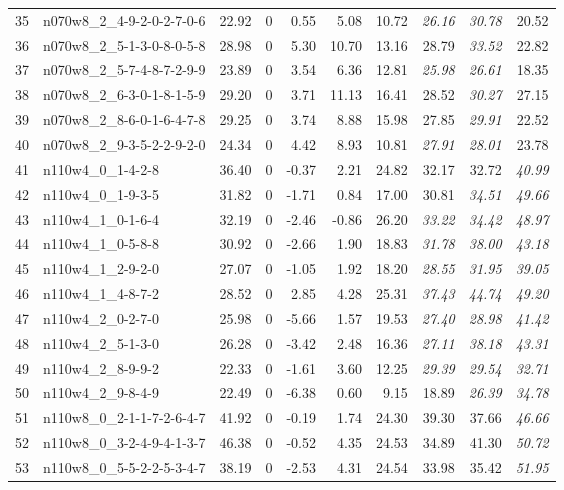 \documentclass[cic,tc, twoside]{iiufrgs}
\begin{document}
\begin{table}[!]
{\begin{tabular}{rlrrrrrrrr}
   35 & n070w8\_2\_4-9-2-0-2-7-0-6 & 22.92 &   0 & 0.55 & 5.08 & 10.72 & \it 26.16 & \it 30.78 & 20.52 \\
   36 & n070w8\_2\_5-1-3-0-8-0-5-8 & 28.98 &   0 & 5.30 & 10.70 & 13.16 & 28.79 & \it 33.52 & 22.82 \\
   37 & n070w8\_2\_5-7-4-8-7-2-9-9 & 23.89 &   0 & 3.54 & 6.36 & 12.81 & \it 25.98 & \it 26.61 & 18.35 \\
   38 & n070w8\_2\_6-3-0-1-8-1-5-9 & 29.20 &   0 & 3.71 & 11.13 & 16.41 & 28.52 & \it 30.27 & 27.15 \\
   39 & n070w8\_2\_8-6-0-1-6-4-7-8 & 29.25 &   0 & 3.74 & 8.88 & 15.98 & 27.85 & \it 29.91 & 22.52 \\
   40 & n070w8\_2\_9-3-5-2-2-9-2-0 & 24.34 &   0 & 4.42 & 8.93 & 10.81 & \it 27.91 & \it 28.01 & 23.78 \\
   41 & n110w4\_0\_1-4-2-8 & 36.40 &   0 & -0.37 & 2.21 & 24.82 & 32.17 & 32.72 & \it 40.99 \\
   42 & n110w4\_0\_1-9-3-5 & 31.82 &   0 & -1.71 & 0.84 & 17.00 & 30.81 & \it 34.51 & \it 49.66 \\
   43 & n110w4\_1\_0-1-6-4 & 32.19 &   0 & -2.46 & -0.86 & 26.20 & \it 33.22 & \it 34.42 & \it 48.97 \\
   44 & n110w4\_1\_0-5-8-8 & 30.92 &   0 & -2.66 & 1.90 & 18.83 & \it 31.78 & \it 38.00 & \it 43.18 \\
   45 & n110w4\_1\_2-9-2-0 & 27.07 &   0 & -1.05 & 1.92 & 18.20 & \it 28.55 & \it 31.95 & \it 39.05 \\
   46 & n110w4\_1\_4-8-7-2 & 28.52 &   0 & 2.85 & 4.28 & 25.31 & \it 37.43 & \it 44.74 & \it 49.20 \\
   47 & n110w4\_2\_0-2-7-0 & 25.98 &   0 & -5.66 & 1.57 & 19.53 & \it 27.40 & \it 28.98 & \it 41.42 \\
   48 & n110w4\_2\_5-1-3-0 & 26.28 &   0 & -3.42 & 2.48 & 16.36 & \it 27.11 & \it 38.18 & \it 43.31 \\
   49 & n110w4\_2\_8-9-9-2 & 22.33 &   0 & -1.61 & 3.60 & 12.25 & \it 29.39 & \it 29.54 & \it 32.71 \\
   50 & n110w4\_2\_9-8-4-9 & 22.49 &   0 & -6.38 & 0.60 & 9.15 & 18.89 & \it 26.39 & \it 34.78 \\
   51 & n110w8\_0\_2-1-1-7-2-6-4-7 & 41.92 &   0 & -0.19 & 1.74 & 24.30 & 39.30 & 37.66 & \it 46.66 \\
   52 & n110w8\_0\_3-2-4-9-4-1-3-7 & 46.38 &   0 & -0.52 & 4.35 & 24.53 & 34.89 & 41.30 & \it 50.72 \\
   53 & n110w8\_0\_5-5-2-2-5-3-4-7 & 38.19 &   0 & -2.53 & 4.31 & 24.54 & 33.98 & 35.42 & \it 51.95 \\

\end{tabular}}
\end{table}
\end{document}
